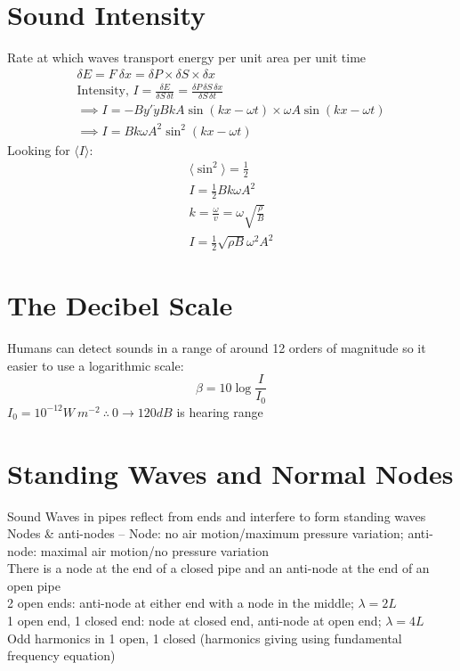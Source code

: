 \documentclass[a4paper, 11pt, fleqn, normalem]{report}
\begin{document}
\section{Sound Intensity}
Rate at which waves transport energy per unit area per unit time
\begin{gather*}
    \delta E = F\:\delta x = \delta P\times \delta S\times \delta x \\
    \text{Intensity, } I = \frac{\delta E}{\delta S\,\delta t} = \frac{\delta P\,\delta S\,\delta x}{\delta S\,\delta t} \\
    \implies I = -By'\dot{y} BkA\sin{(kx - \omega t)}\times\omega A\sin{(kx - \omega t)} \\
    \implies I = Bk\omega A^{2}\sin^{2}{(kx - \omega t)}
\end{gather*}
Looking for $\langle I\rangle$:
\begin{gather*}
    \langle\sin^{2}\rangle = \frac{1}{2} \\
    I = \frac{1}{2}Bk\omega A^{2} \\
    k = \frac{\omega}{v} = \omega\sqrt{\frac{\rho}{B}} \\
    I = \frac{1}{2}\sqrt{\rho B}\omega^{2}A^{2}
\end{gather*}

\section{The Decibel Scale}
Humans can detect sounds in a range of around 12 orders of magnitude so it easier to use a logarithmic scale:
\begin{equation*}
    \beta = 10\log{\frac{I}{I_{0}}}
\end{equation*}
$I_{0} = 10^{-12} W\:m^{-2} ~\therefore~ 0 \rightarrow 120dB$ is hearing range

\section{Standing Waves and Normal Nodes}
Sound Waves in pipes reflect from ends and interfere to form standing waves \\
Nodes \& anti-nodes --
Node: no air motion/maximum pressure variation; anti-node: maximal air motion/no pressure variation \\
There is a node at the end of a closed pipe and an anti-node at the end of an open pipe \\
2 open ends: anti-node at either end with a node in the middle; $\lambda = 2L$ \\
1 open end, 1 closed end: node at closed end, anti-node at open end; $\lambda = 4L$ \\
Odd harmonics in 1 open, 1 closed (harmonics giving using fundamental frequency equation)
\end{document}
